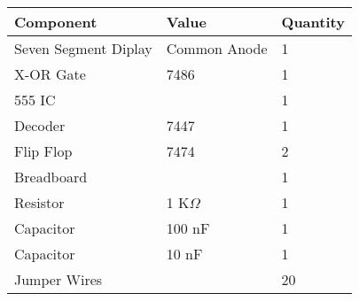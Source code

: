 \begin{tabular}{|l|l|l|}\hline
	\textbf{Component}	&\textbf{Value} &\textbf{Quantity}\\ \hline
	Seven Segment Diplay &Common Anode &1 \\ \hline
	X-OR Gate &7486 &1 \\ \hline
	555 IC & &1 \\ \hline
	Decoder &7447 &1 \\ \hline
	Flip Flop &7474 &2 \\ \hline
	Breadboard & &1 \\ \hline
	Resistor &1 K$\Omega$ &1 \\ \hline
	Capacitor &100 nF &1 \\ \hline
	Capacitor &10 nF &1 \\ \hline
	Jumper Wires & &20 \\ \hline
\end{tabular}
